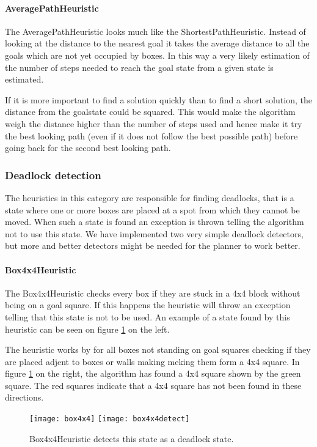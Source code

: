\paragraph{AveragePathHeuristic}The AveragePathHeuristic looks much like the ShortestPathHeuristic. Instead of looking at the distance to the nearest goal it takes the average distance to all the goals which are not yet occupied by boxes. In this way a very likely estimation of the number of steps needed to reach the goal state from a given state is estimated.

If it is more important to find a solution quickly than to find a short solution, the distance from the goalstate could be squared. This would make the algorithm weigh the distance higher than the number of steps used and hence make it try the best looking path (even if it does not follow the best possible path) before going back for the second best looking path.

\subsubsection{Deadlock detection}
The heuristics in this category are responsible for finding deadlocks, that is a state where one or more boxes are placed at a spot from which they cannot be moved. When such a state is found an exception is thrown telling the \astar algorithm not to use this state. We have implemented two very simple deadlock detectors, but more and better detectors might be needed for the planner to work better.
\paragraph{Box4x4Heuristic}The Box4x4Heuristic checks every box if they are stuck in a 4x4 block without being on a goal square. If this happens the heuristic will throw an exception telling that this state is not to be used. An example of a state found by this heuristic can be seen on figure \ref{fig:box4x4} on the left.

The heuristic works by for all boxes not standing on goal squares checking if they are placed adjent to boxes or walls making meking them form a 4x4 square. In figure \ref{fig:box4x4} on the right, the algorithm has found a 4x4 square shown by the green square. The red squares indicate that a 4x4 square has not been found in these directions.

\begin{figure}[htp]
	\centering
	\texttt{[image: box4x4]}
	\texttt{[image: box4x4detect]}
	\caption{Box4x4Heuristic detects this state as a deadlock state.}
	\label{fig:box4x4}
\end{figure}

